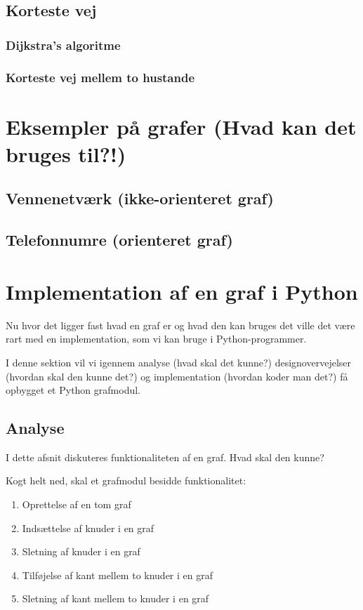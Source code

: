 \documentclass[10pt,a4paper,danish]{article}
\begin{document}
\subsection{Korteste vej}
\label{sec:shortest_path}

\subsubsection{Dijkstra's algoritme}
\subsubsection{Korteste vej mellem to hustande}


\section{Eksempler på grafer (Hvad kan det bruges til?!)}
\subsection{Vennenetværk (ikke-orienteret graf)}
\subsection{Telefonnumre (orienteret graf)}



\section{Implementation af en graf i Python}
Nu hvor det ligger fast hvad en graf er og hvad den kan bruges det
ville det være rart med en implementation, som vi kan bruge i
Python-programmer.

I denne sektion vil vi igennem analyse (hvad skal det kunne?)
designovervejelser (hvordan skal den kunne det?) og implementation
(hvordan koder man det?) få opbygget et Python grafmodul.

\subsection{Analyse}
\label{sec:analyse}
I dette afsnit diskuteres funktionaliteten af en graf. Hvad skal den
kunne?

Kogt helt ned, skal et grafmodul besidde funktionalitet:
\begin{enumerate}
\item Oprettelse af en tom graf
\item Indsættelse af knuder i en graf
\item Sletning af knuder i en graf
\item Tilføjelse af kant mellem to knuder i en graf
\item Sletning af kant mellem to knuder i en graf
\end{enumerate}
\end{document}
